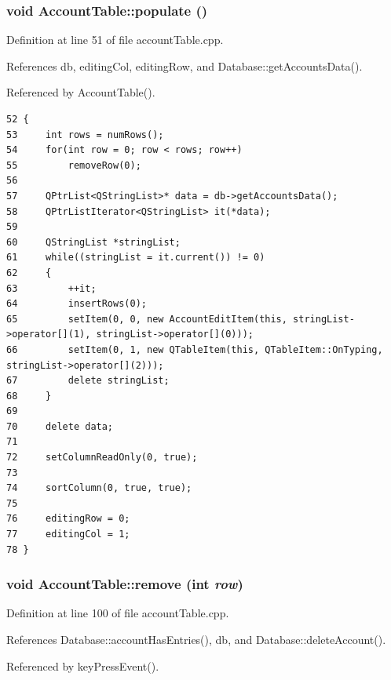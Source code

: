 \hypertarget{classAccountTable_a2}{
\subsubsection[populate]{\setlength{\rightskip}{0pt plus 5cm}void Account\-Table::populate ()}}
\label{classAccountTable_a2}


Definition at line 51 of file account\-Table.cpp.

References db, editing\-Col, editing\-Row, and Database::get\-Accounts\-Data().

Referenced by Account\-Table().

\footnotesize\begin{verbatim}52 {
53     int rows = numRows();
54     for(int row = 0; row < rows; row++)
55         removeRow(0);
56     
57     QPtrList<QStringList>* data = db->getAccountsData();
58     QPtrListIterator<QStringList> it(*data);
59     
60     QStringList *stringList;
61     while((stringList = it.current()) != 0)
62     {
63         ++it;
64         insertRows(0);
65         setItem(0, 0, new AccountEditItem(this, stringList->operator[](1), stringList->operator[](0)));
66         setItem(0, 1, new QTableItem(this, QTableItem::OnTyping, stringList->operator[](2)));
67         delete stringList;
68     }
69 
70     delete data;
71 
72     setColumnReadOnly(0, true);
73     
74     sortColumn(0, true, true);
75 
76     editingRow = 0;
77     editingCol = 1;
78 }
\end{verbatim}\normalsize 


\hypertarget{classAccountTable_d2}{
\subsubsection[remove]{\setlength{\rightskip}{0pt plus 5cm}void Account\-Table::remove (int {\em row})}}
\label{classAccountTable_d2}


Definition at line 100 of file account\-Table.cpp.

References Database::account\-Has\-Entries(), db, and Database::delete\-Account().

Referenced by key\-Press\-Event().

